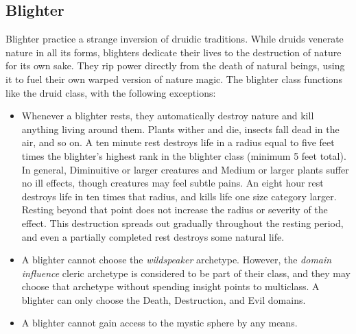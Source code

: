     \subsection{Blighter}
        Blighter practice a strange inversion of druidic traditions.
        While druids venerate nature in all its forms, blighters dedicate their lives to the destruction of nature for its own sake.
        They rip power directly from the death of natural beings, using it to fuel their own warped version of nature magic.
        The blighter class functions like the druid class, with the following exceptions:
        \begin{itemize}
            \item Whenever a blighter rests, they automatically destroy nature and kill anything living around them.
                Plants wither and die, insects fall dead in the air, and so on.
                A ten minute rest destroys life in a radius equal to five feet times the blighter's highest rank in the blighter class (minimum 5 feet total).
                In general, Diminuitive or larger creatures and Medium or larger plants suffer no ill effects, though creatures may feel subtle pains.
                An eight hour rest destroys life in ten times that radius, and kills life one size category larger.
                Resting beyond that point does not increase the radius or severity of the effect.
                This destruction spreads out gradually throughout the resting period, and even a partially completed rest destroys some natural life.
            \item A blighter cannot choose the \textit{wildspeaker} archetype.
                However, the \textit{domain influence} cleric archetype is considered to be part of their class, and they may choose that archetype without spending insight points to multiclass.
                A blighter can only choose the Death, Destruction, and Evil domains.
            \item A blighter cannot gain access to the  mystic sphere by any means.
        \end{itemize}

